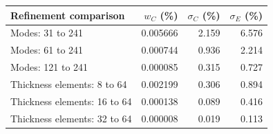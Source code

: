 \begin{tabularx}{\linewidth}{Xrrr}
\toprule
Refinement comparison & $w_C$ (\%) & $\sigma_C$ (\%) & $\sigma_E$ (\%) \\
\midrule
Modes: 31 to 241 & 0.005666 & 2.159 & 6.576 \\
Modes: 61 to 241 & 0.000744 & 0.936 & 2.214 \\
Modes: 121 to 241 & 0.000085 & 0.315 & 0.727 \\
Thickness elements: 8 to 64 & 0.002199 & 0.306 & 0.894 \\
Thickness elements: 16 to 64 & 0.000138 & 0.089 & 0.416 \\
Thickness elements: 32 to 64 & 0.000008 & 0.019 & 0.113 \\
\bottomrule
\end{tabularx}
